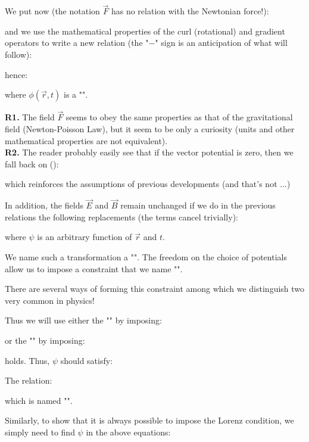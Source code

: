 	We put now (the notation $\vec{F}$ has no relation with the Newtonian force!):
	
	and we use the mathematical properties of the curl (rotational) and gradient operators to write a new relation (the "$-$" sign is an anticipation of what will follow):
	
	hence:
	
	where $\phi(\vec{r},t)$ is a "". 
	\begin{tcolorbox}[title=Remarks,colframe=black,arc=10pt]
	\textbf{R1.} The field $\vec{F}$ seems to obey the same properties as that of the gravitational field (Newton-Poisson Law), but it seem to be only a curiosity (units and other mathematical properties are not equivalent).\\
	
	\textbf{R2.} The reader probably easily see that if the vector potential is zero, then we fall back on ():
	
	which reinforces the assumptions of previous developments (and that's not ...)
	\end{tcolorbox}
	In addition, the fields $\vec{E}$ and $\vec{B}$ remain unchanged if we do in the previous relations the following replacements (the terms cancel trivially):
	
	where $\psi$ is an arbitrary function of $\vec{r}$ and $t$.
	
	We name such a transformation a "". The freedom on the choice of potentials allow us to impose a constraint that we name "".
	
	There are several ways of forming this constraint among which we distinguish two very common in physics!

	Thus we will use either the "" by imposing:
	
	or the "" by imposing:
	
	holds. Thus, $\psi$ should satisfy:
	
	The relation:
	
	which is named "".
	
	Similarly, to show that it is always possible to impose the Lorenz condition, we simply need to find $\psi$ in the above equations:
	
